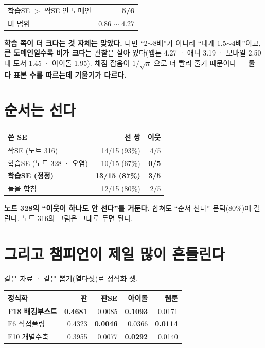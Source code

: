 \documentclass[10pt]{article}
\begin{document}
\begin{center}\small
\begin{tabular}{lr}
\hline
학습SE $>$ 짝SE 인 도메인 & \textbf{5/6} \\
비 범위 & 0.86 $\sim$ 4.27 \\
\hline
\end{tabular}
\end{center}

\textbf{학습 쪽이 더 크다는 것 자체는 맞았다.} 다만 ``2$\sim$8배''가 아니라
``대개 1.5$\sim$4배''이고, \textbf{큰 도메인일수록 비가 크다}는 관찰은
살아 있다(웹툰 4.27 · 애니 3.19 · 모바일 2.50 대 도서 1.45 · 아이돌 1.95).
채점 잡음이 $1/\sqrt{n}$ 으로 더 빨리 줄기 때문이다 --- \textbf{둘 다
표본 수를 따르는데 기울기가 다르다.}

\section{순서는 선다}

\begin{center}\footnotesize
\begin{tabular}{lrr}
\hline
쓴 SE & 선 쌍 & 이웃 \\
\hline
짝SE (노트 316) & 14/15 (93\%) & 4/5 \\
학습SE (노트 328 · 오염) & 10/15 (67\%) & \textbf{0/5} \\
\textbf{학습SE (정정)} & \textbf{13/15 (87\%)} & \textbf{3/5} \\
둘을 합침 & 12/15 (80\%) & 2/5 \\
\hline
\end{tabular}
\end{center}

\textbf{노트 328의 ``이웃이 하나도 안 선다''를 거둔다.} 합쳐도 ``순서
선다'' 문턱(80\%)에 걸린다. 노트 316의 그림은 그대로 두면 된다.

\section{그리고 챔피언이 제일 많이 흔들린다}

같은 자료 · 같은 뽑기(열다섯)로 정식화 셋.

\begin{center}\footnotesize
\begin{tabular}{lrrrr}
\hline
정식화 & 판 & 판SE & 아이돌 & 웹툰 \\
\hline
\textbf{F18 배깅부스트} & \textbf{0.4681} & 0.0085 & \textbf{0.1093} & 0.0171 \\
F6 직접풀링 & 0.4323 & \textbf{0.0046} & 0.0366 & \textbf{0.0114} \\
F10 개별수축 & 0.3955 & 0.0077 & \textbf{0.0292} & 0.0140 \\
\hline
\end{tabular}
\end{center}
\end{document}
